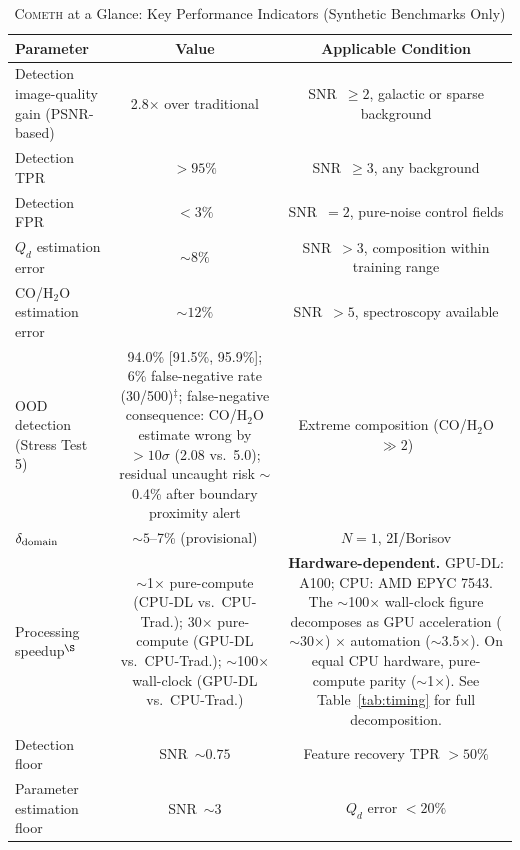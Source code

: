 \documentclass[usenatbib]{mnras}
\begin{document}
\vspace{4pt}
\begin{table}
\centering
\caption{\textsc{Cometh} at a Glance: Key Performance Indicators (Synthetic Benchmarks Only)}\label{tab:key_numbers}
\begin{tabular}{lcc}
\toprule
Parameter & Value & Applicable Condition \\
\midrule
Detection image-quality gain (PSNR-based) & 2.8$\times$ over traditional & SNR~$\geq 2$, galactic or sparse background \\
Detection TPR & $>95\%$ & SNR~$\geq 3$, any background \\
Detection FPR & $<3\%$ & SNR~$=2$, pure-noise control fields \\
$Q_d$ estimation error & $\sim 8\%$ & SNR~$>3$, composition within training range \\
CO/H$_2$O estimation error & $\sim 12\%$ & SNR~$>5$, spectroscopy available \\
OOD detection (Stress Test 5) & 94.0\% [91.5\%, 95.9\%]; 6\% false-negative rate (30/500)$^\ddagger$; false-negative consequence: CO/H$_2$O estimate wrong by $>10\sigma$ (2.08 vs.\ 5.0); residual uncaught risk $\sim$0.4\% after boundary proximity alert & Extreme composition (CO/H$_2$O $\gg 2$) \\
$\delta_{\rm domain}$ & $\sim 5$--7\% (provisional) & $N=1$, 2I/Borisov \\
Processing speedup$^\S$ & $\sim$1$\times$ pure-compute (CPU-DL vs.\ CPU-Trad.); 30$\times$ pure-compute (GPU-DL vs.\ CPU-Trad.); $\sim$100$\times$ wall-clock (GPU-DL vs.\ CPU-Trad.) & \textbf{Hardware-dependent.} GPU-DL: A100; CPU: AMD EPYC 7543. The $\sim$100$\times$ wall-clock figure decomposes as GPU acceleration ($\sim$30$\times$) $\times$ automation ($\sim$3.5$\times$). On equal CPU hardware, pure-compute parity ($\sim$1$\times$). See Table~\ref{tab:timing} for full decomposition. \\
Detection floor & SNR~$\sim 0.75$ & Feature recovery TPR $>50\%$ \\
Parameter estimation floor & SNR~$\sim 3$ & $Q_d$ error $<20\%$ \\
\bottomrule
\end{tabular}

\end{table}
\end{document}
